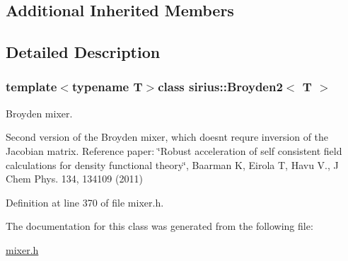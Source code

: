 \subsection*{Additional Inherited Members}


\subsection{Detailed Description}
\subsubsection*{template$<$typename T$>$class sirius\+::\+Broyden2$<$ T $>$}

Broyden mixer. 

Second version of the Broyden mixer, which doesn\textquotesingle{}t requre inversion of the Jacobian matrix. Reference paper\+: \char`\"{}\+Robust acceleration of self consistent field calculations for 
density functional theory\char`\"{}, Baarman K, Eirola T, Havu V., J Chem Phys. 134, 134109 (2011) 

Definition at line 370 of file mixer.\+h.



The documentation for this class was generated from the following file\+:\begin{DoxyCompactItemize}
\item 
\hyperlink{mixer_8h}{mixer.\+h}\end{DoxyCompactItemize}
